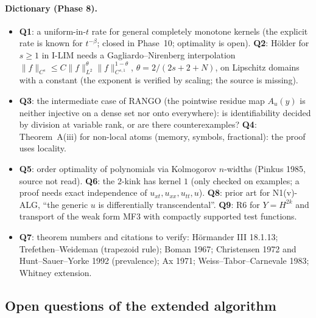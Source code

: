 \documentclass[11pt]{article}
\theoremstyle{plain}
\theoremstyle{definition}
\theoremstyle{remark}
\begin{document}
\paragraph{Dictionary (Phase 8).}
\begin{itemize}
\item \textbf{Q1}: a uniform-in-$t$ rate for general completely monotone kernels (the explicit rate is known for $t^{-\beta}$; closed in Phase~10; optimality is open). \textbf{Q2}: H\"older for $s\ge1$ in I-LIM needs a Gagliardo--Nirenberg interpolation $\|f\|_{C^s}\le C\|f\|_{L^2}^\theta\|f\|_{C^{s,1}}^{1-\theta}$, $\theta=2/(2s+2+N)$, on Lipschitz domains with a constant (the exponent is verified by scaling; the source is missing).
\item \textbf{Q3}: the intermediate case of RANGO (the pointwise residue map $A_u(y)$ is neither injective on a dense set nor onto everywhere): is identifiability decided by division at variable rank, or are there counterexamples? \textbf{Q4}: Theorem~A(iii) for non-local atoms (memory, symbols, fractional): the proof uses locality.
\item \textbf{Q5}: order optimality of polynomials via Kolmogorov $n$-widths (Pinkus 1985, source not read). \textbf{Q6}: the $2$-kink has kernel $1$ (only checked on examples; a proof needs exact independence of $u_{xt},u_{xx},u_{tt},u$). \textbf{Q8}: prior art for N1(v)-ALG, ``the generic $u$ is differentially transcendental''. \textbf{Q9}: R6 for $Y=H^{2k}$ and transport of the weak form MF3 with compactly supported test functions.
\item \textbf{Q7}: theorem numbers and citations to verify: H\"ormander III 18.1.13; Trefethen--Weideman (trapezoid rule); Boman 1967; Christensen 1972 and Hunt--Sauer--Yorke 1992 (prevalence); Ax 1971; Weiss--Tabor--Carnevale 1983; Whitney extension.
\end{itemize}

\subsection{Open questions of the extended algorithm}
\end{document}
